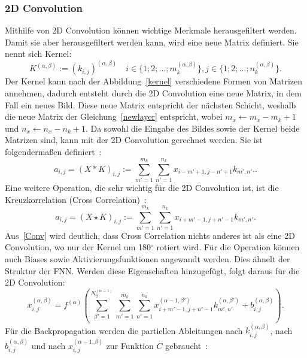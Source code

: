 \documentclass[11pt]{article}
\begin{document}
\subsubsection{2D Convolution}
Mithilfe von 2D Convolution können wichtige Merkmale herausgefiltert werden. Damit sie aber herausgefiltert werden kann, wird
eine neue Matrix definiert. Sie nennt sich Kernel:
\begin{equation}
    K^{(\alpha,\beta)}:={(k_{i,j})}^{(\alpha,\beta)} \quad i \in\{1;2;\ldots;m_{k}^{(\alpha,\beta)}\}, j \in\{1;2;\ldots;n_{k}^{(\alpha,\beta)}\}.
\end{equation}
Der Kernel kann nach der Abbildung~\ref{kernel} verschiedene Formen von Matrizen annehmen, dadurch entsteht durch die 2D Convolution eine neue Matrix, in dem Fall ein neues Bild.
Diese neue Matrix entspricht der nächsten Schicht, weshalb die neue Matrix der Gleichung~\ref{newlayer} entspricht, wobei $ m_x \leftarrow m_x - m_k + 1 $ und $ n_x \leftarrow n_x - n_k + 1 $.
Da sowohl die Eingabe des Bildes sowie der Kernel beide Matrizen sind, kann mit der 2D Convolution gerechnet werden. Sie ist
folgendermaßen definiert~\cite{16}:
\begin{equation}
    a_{i,j} = {(X \ast K)}_{i,j} := \sum_{m'=1}^{m_{k}} \sum_{n'=1}^{n_{k}} x_{i-m'+1,j-n'+1}k_{m',n'}. \label{Conv}.
\end{equation}
Eine weitere Operation, die sehr wichtig für die 2D Convolution ist, ist die Kreuzkorrelation (Cross Correlation)~\cite{16}:
\begin{equation}
    a_{i,j} = {(X \star K)}_{i,j} := \sum_{m'=1}^{m_{k}} \sum_{n'=1}^{n_{k}} x_{i+m'-1,j+n'-1}k_{m',n'}.
\end{equation}
Aus~\eqref{Conv} wird deutlich, dass Cross Correlation nichts anderes ist als eine 2D Convolution, wo nur der Kernel um 180$^{\circ}$
rotiert wird. Für die Operation können auch Biases sowie Aktivierungsfunktionen angewandt werden. Dies ähnelt der Struktur der FNN.\@
Werden diese Eigenschaften hinzugefügt, folgt daraus für die 2D Convolution:
\begin{equation}
    x_{i,j}^{(\alpha,\beta)} = f^{(\alpha)}(\sum_{\beta'=1}^{N_{\beta}^{(\alpha-1)}} \sum_{m'=1}^{m_{k}} \sum_{n'=1}^{n_{k}} x_{i+m'-1,j+n'-1}^{(\alpha-1,\beta')}k_{m',n'}^{(\alpha,\beta')}+b_{i,j}^{(\alpha,\beta)}).
\end{equation}
Für die Backpropagation werden die partiellen Ableitungen nach $k_{i,j}^{(\alpha,\beta)}$, nach $b_{i,j}^{(\alpha,\beta)}$ und nach $x_{i,j}^{(\alpha-1,\beta)}$ zur Funktion $C$ gebraucht~\cite{16}:
\end{document}
